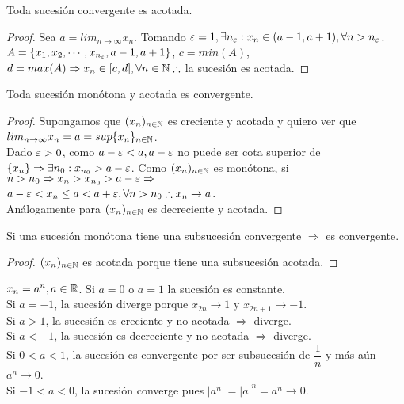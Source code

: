 \begin{theorem}
  Toda sucesión convergente es acotada.
  \begin{proof}
    Sea \(a = lim_{n \to \infty} x_n\). Tomando \(\varepsilon = 1, \exists n_{\varepsilon} : x_n \in (a - 1, a+1), \forall n > n_{\varepsilon}\). \\
    \(A = \{ x_1, x_2, \cdots, x_{n_{\varepsilon}}, a-1, a+1 \}\), \(c = min(A)\), \(d = max(A) \Rightarrow x_n \in [c, d], \forall n \in \mathbb{N} \therefore\) la sucesión es acotada.
  \end{proof}
\end{theorem}

\begin{theorem}
  Toda sucesión monótona y acotada es convergente.
  \begin{proof}
    Supongamos que \((x_n)_{n \in \mathbb{N}}\) es creciente y acotada y quiero ver que \(lim_{n \to \infty} x_n = a = sup\{x_n\}_{n \in \mathbb{N}}\). \\
    Dado \(\varepsilon > 0\), como \(a-\varepsilon < a, a-\varepsilon\) no puede ser cota superior de \(\{x_n\} \Rightarrow \exists n_0 : x_{n_0} > a - \varepsilon\).
    Como \((x_n)_{n \in \mathbb{N}}\) es monótona, si \(n > n_0 \Rightarrow x_n > x_{n_0} > a - \varepsilon \Rightarrow\) \\
    \(a-\varepsilon < x_n \leq a < a+\varepsilon, \forall n > n_0 \therefore x_n \to a\). \\
    Análogamente para \((x_n)_{n \in \mathbb{N}}\) es decreciente y acotada.
  \end{proof}
\end{theorem}

\begin{corollary}
  Si una sucesión monótona tiene una subsucesión convergente \(\Rightarrow\) es convergente.
  \begin{proof}
    \((x_n)_{n \in \mathbb{N}}\) es acotada porque tiene una subsucesión acotada.
  \end{proof}
\end{corollary}

\begin{eg}
  \(x_n = a^n, a \in \mathbb{R}\). Si \(a=0\) o \(a = 1\) la sucesión es constante. \\
  Si \(a = -1\), la sucesión diverge porque \(x_{2n} \to 1\) y \(x_{2n+1} \to -1\). \\
  Si \(a > 1\), la sucesión es creciente y no acotada \(\Rightarrow\) diverge. \\
  Si \(a < -1\), la sucesión es decreciente y no acotada \(\Rightarrow\) diverge. \\
  Si \(0 < a < 1\), la sucesión es convergente por ser subsucesión de \(\dfrac{1}{n}\) y más aún \(a^n \to 0\). \\
  Si \(-1 < a < 0\), la sucesión converge pues \(|a^n| = |a|^n = a^n \to 0\).
\end{eg}

